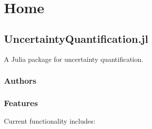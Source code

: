\newcommand{\DocMainTitle}{UncertaintyQuantification.jl}
\newcommand{\DocVersion}{}
\newcommand{\DocAuthors}{Jasper Behrensdorf and Ander Gray}
\newcommand{\JuliaVersion}{1.11.4}




\part{Home}




\chapter{UncertaintyQuantification.jl}



\label{10326402411837190628}{}


A Julia package for uncertainty quantification.



\section{Authors}



\label{3633061387637902549}{}




\section{Features}



\label{7269310191258299096}{}


Current functionality includes:



